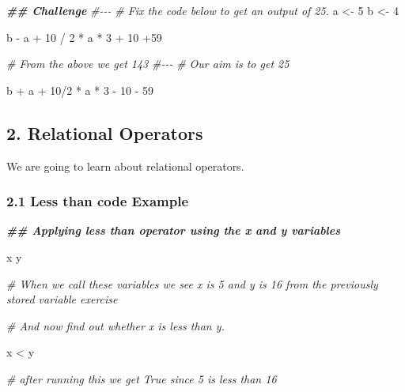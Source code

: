 \documentclass[
]{article}
\newenvironment{Shaded}{\begin{snugshade}}{\end{snugshade}}
\newcommand{\CommentTok}[1]{\textcolor[rgb]{0.56,0.35,0.01}{\textit{#1}}}
\newcommand{\DecValTok}[1]{\textcolor[rgb]{0.00,0.00,0.81}{#1}}
\newcommand{\DocumentationTok}[1]{\textcolor[rgb]{0.56,0.35,0.01}{\textbf{\textit{#1}}}}
\newcommand{\NormalTok}[1]{#1}
\newcommand{\OtherTok}[1]{\textcolor[rgb]{0.56,0.35,0.01}{#1}}
\newcommand{\SpecialCharTok}[1]{\textcolor[rgb]{0.00,0.00,0.00}{#1}}
\begin{document}
\begin{Shaded}
\begin{Highlighting}[]

\DocumentationTok{\#\# Challenge}
\CommentTok{\#{-}{-}{-}}
\CommentTok{\# Fix the code below to get an output of 25. }
\NormalTok{a }\OtherTok{\textless{}{-}} \DecValTok{5}
\NormalTok{b }\OtherTok{\textless{}{-}} \DecValTok{4}

\NormalTok{b }\SpecialCharTok{{-}}\NormalTok{ a }\SpecialCharTok{+} \DecValTok{10} \SpecialCharTok{/} \DecValTok{2} \SpecialCharTok{*}\NormalTok{ a }\SpecialCharTok{*} \DecValTok{3} \SpecialCharTok{+} \DecValTok{10} \SpecialCharTok{+}\DecValTok{59}

\CommentTok{\# From the above we get 143}
\CommentTok{\#{-}{-}{-} }
\CommentTok{\# Our aim is to get 25}

\NormalTok{b }\SpecialCharTok{+}\NormalTok{ a }\SpecialCharTok{+} \DecValTok{10}\SpecialCharTok{/}\DecValTok{2} \SpecialCharTok{*}\NormalTok{ a }\SpecialCharTok{*} \DecValTok{3} \SpecialCharTok{{-}} \DecValTok{10} \SpecialCharTok{{-}} \DecValTok{59}
\end{Highlighting}
\end{Shaded}

\hypertarget{relational-operators}{%
\subsection{2. Relational Operators}\label{relational-operators}}

We are going to learn about relational operators.

\hypertarget{less-than-code-example}{%
\subsubsection{2.1 Less than code
Example}\label{less-than-code-example}}

\begin{Shaded}
\begin{Highlighting}[]

\DocumentationTok{\#\# Applying less than operator using the x and y variables}

\NormalTok{x}
\NormalTok{y}

\CommentTok{\# When we call these variables we see x is 5 and y is 16 from the previously stored variable exercise}

\CommentTok{\# And now find out whether x is less than y.}

\NormalTok{x }\SpecialCharTok{\textless{}}\NormalTok{ y}

\CommentTok{\# after running this we get True since 5 is less than 16}
\end{Highlighting}
\end{Shaded}
\end{document}
